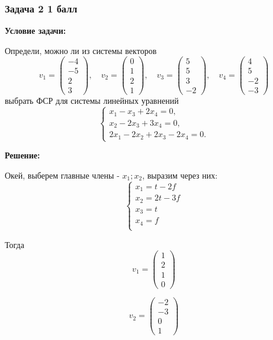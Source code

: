 \documentclass[a4paper,12pt]{article}
\begin{document}
\subsubsection{Задача 2 \hfill 1 балл}
\textbf{Условие задачи:}

Определи, можно ли из системы векторов
\[
v_1 =
\begin{pmatrix}
-4 \\
-5 \\
2 \\
3
\end{pmatrix},
\quad
v_2 =
\begin{pmatrix}
0 \\
1 \\
2 \\
1
\end{pmatrix},
\quad
v_3 =
\begin{pmatrix}
5 \\
5 \\
3 \\
-2
\end{pmatrix},
\quad
v_4 =
\begin{pmatrix}
4 \\
5 \\
-2 \\
-3
\end{pmatrix}
\]
выбрать ФСР для системы линейных уравнений
\[
\begin{cases}
x_1 - x_3 + 2x_4 = 0, \\
x_2 - 2x_3 + 3x_4 = 0, \\
2x_1 - 2x_2 + 2x_3 - 2x_4 = 0.
\end{cases}
\]

\textbf{Решение:}

Окей, выберем главные члены - $x_1; x_2$, выразим через них:
\[
\begin{cases}
x_1 = t - 2f \\
x_2 = 2t - 3f \\
x_3 = t \\
x_4 = f \\
\end{cases}
\]

Тогда
\[
v_1 =
\begin{pmatrix}
    1\\
    2\\
    1\\
    0
\end{pmatrix}
\]

\[
v_2 =
\begin{pmatrix}
    -2\\
    -3\\
    0\\
    1
\end{pmatrix}
\]
\end{document}
